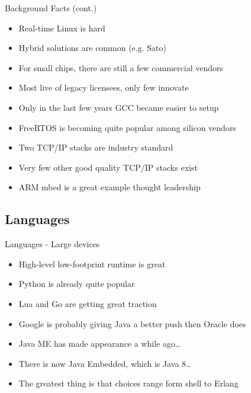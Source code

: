 \documentclass{beamer}
\begin{document}
\begin{frame}{Background Facts (cont.)}
\begin{itemize}
  \item Real-time Linux is hard
  \item Hybrid solutions are common (e.g. Sato)
  \item For small chips, there are still a few commercial vendors
  \item Most live of legacy licensees, only few innovate
  \item Only in the last few years GCC became easier to setup
  \item FreeRTOS is becoming quite popular among silicon vendors
  \item Two TCP/IP stacks are industry standard
  \item Very few other good quality TCP/IP stacks exist
  \item ARM mbed is a great example thought leadership
\end{itemize}
\end{frame}


\subsection{Languages}

\begin{frame}{Languages - Large devices}
\begin{itemize}
  \item High-level low-footprint runtime is great
  \item Python is already quite popular
  \item Lua and Go are getting great traction
  \item Google is probably giving Java a better push then Oracle does
  \item Java ME has made appearance a while ago\dots
  \item There is now Java Embedded, which is Java 8\dots
  \item The greatest thing is that choices range form shell to Erlang
\end{itemize}
\end{frame}
\end{document}
